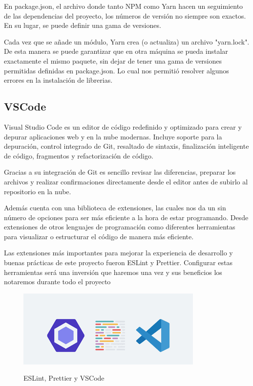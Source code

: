 \documentclass[12pt,twoside,titlepage]{report}
\begin{document}
En package.json, el archivo donde tanto NPM como Yarn hacen un seguimiento de las dependencias del proyecto, los números de versión no siempre son exactos. En su lugar, se puede definir una gama de versiones.

Cada vez que se añade un módulo, Yarn crea (o actualiza) un archivo "yarn.lock". De esta manera se puede garantizar que en otra máquina se pueda instalar exactamente el mismo paquete, sin dejar de tener una gama de versiones permitidas definidas en package.json. Lo cual nos permitió resolver algunos errores en la instalación de librerias.

\subsection{VSCode}

Visual Studio Code es un editor de código redefinido y optimizado para crear y depurar aplicaciones web y en la nube modernas. Incluye soporte para la depuración, control integrado de Git, resaltado de sintaxis, finalización inteligente de código, fragmentos y refactorización de código.

Gracias a su integración de Git es sencillo revisar las diferencias, preparar los archivos y realizar confirmaciones directamente desde el editor antes de subirlo al repositorio en la nube.

Además cuenta con una biblioteca de extensiones, las cuales nos da un sin número de opciones para ser más eficiente a la hora de estar programando. Desde extensiones de otros lenguajes de programación como diferentes herramientas para visualizar o estructurar el código de manera más eficiente.

Las extensiones más importantes para mejorar la experiencia de desarrollo y buenas prácticas de este proyecto fueron ESLint y Prettier. Configurar estas herramientas será una inversión que haremos una vez y sus beneficios los notaremos durante todo el proyecto

\begin{figure}[H]
    \centering
    \includegraphics[scale=0.8]{VSCode/VScodeExtensions}
    \label{fig:VScode_extensions}
    \caption{ESLint, Prettier y VSCode}
\end{figure}
\end{document}
